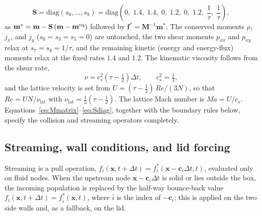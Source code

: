 \begin{equation}
\mathbf{S}=\mathrm{diag}(s_0,\dots,s_8)
=\mathrm{diag}\!\left(0,\;1.4,\;1.4,\;0,\;1.2,\;0,\;1.2,\;\frac{1}{\tau},\;\frac{1}{\tau}\right),
\label{eq:Sdiag}
\end{equation}
as $\mathbf{m}^*=\mathbf{m}-\mathbf{S}\,(\mathbf{m}-\mathbf{m}^{\rm eq})$ followed by $\mathbf{f}^*=\mathbf{M}^{-1}\mathbf{m}^*$. The conserved moments $\rho$, $j_x$, and $j_y$ ($s_0=s_3=s_5=0$) are untouched, the two shear moments $p_{xx}$ and $p_{xy}$ relax at $s_7=s_8=1/\tau$, and the remaining kinetic (energy and energy-flux) moments relax at the fixed rates $1.4$ and $1.2$. The kinematic viscosity follows from the shear rate,
\begin{equation}
\nu = c_s^2\left(\tau-\tfrac{1}{2}\right)\Delta t, \qquad c_s^2=\tfrac{1}{3},
\end{equation}
and the lattice velocity is set from $U=(\tau-\tfrac12)\,Re/(3N)$, so that $Re=UN/\nu_{\mathrm{lat}}$ with $\nu_{\mathrm{lat}}=\tfrac13(\tau-\tfrac12)$. The lattice Mach number is $Ma=U/c_s$. Equations~\eqref{eq:Mmatrix}--\eqref{eq:Sdiag}, together with the boundary rules below, specify the collision and streaming operators completely.

\subsection{Streaming, wall conditions, and lid forcing}

Streaming is a pull operation, $f_i(\mathbf{x},t+\Delta t)=f_i^*(\mathbf{x}-\mathbf{c}_i\Delta t,t)$, evaluated only on fluid nodes. When the upstream node $\mathbf{x}-\mathbf{c}_i\Delta t$ is solid or lies outside the box, the incoming population is replaced by the half-way bounce-back value $f_i(\mathbf{x},t+\Delta t)=f_{\bar i}^*(\mathbf{x},t)$, where $\bar i$ is the index of $-\mathbf{c}_i$; this is applied on the two side walls and, as a fallback, on the lid.

